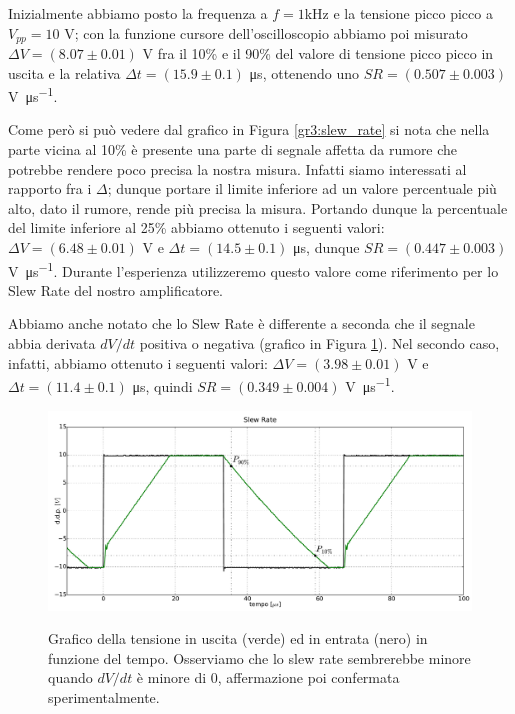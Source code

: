 Inizialmente abbiamo posto la frequenza a $f=1$\si{\kilo\hertz} e la tensione picco picco a $V_{pp}=10$ \si{\volt}; con la funzione cursore dell'oscilloscopio abbiamo poi misurato $\Delta V = (8.07 \pm 0.01)$ \si{\volt} fra il 10\% e il 90\% del valore di tensione picco picco in uscita e la relativa $\Delta t = (15.9 \pm 0.1)$ \si{\micro\second}, ottenendo uno $SR=(0.507 \pm 0.003)$ \si{\volt\per\micro\second}.

Come però si può vedere dal grafico in Figura \ref{gr3:slew_rate} si nota che nella parte vicina al 10\% è presente una parte di segnale affetta da rumore che potrebbe rendere poco precisa la nostra misura. Infatti siamo interessati al rapporto fra i $\Delta$; dunque portare il limite inferiore ad un valore percentuale più alto, dato il rumore, rende più precisa la misura. Portando dunque la percentuale del limite inferiore al 25\% abbiamo ottenuto i seguenti valori: $\Delta V = (6.48 \pm 0.01)$ \si{\volt} e $\Delta t = (14.5 \pm 0.1)$ \si{\micro\second}, dunque $SR = (0.447 \pm 0.003)$ \si{\volt\per\micro\second}. Durante l'esperienza utilizzeremo questo valore come riferimento per lo Slew Rate del nostro amplificatore.

Abbiamo anche notato che lo Slew Rate è differente a seconda che il segnale abbia derivata $dV/dt$ positiva o negativa (grafico in Figura \ref{gr3:slew_rate_down}). Nel secondo caso, infatti, abbiamo ottenuto i seguenti valori: $\Delta V = (3.98 \pm 0.01)$ \si{\volt} e $\Delta t = (11.4 \pm 0.1)$ \si{\micro\second}, quindi $SR = (0.349 \pm 0.004)$ \si{\volt\per\micro\second}.

\begin{figure}[ht]
 \centering
   {\includegraphics[width=16.5cm]{../E03/latex/sr_down.pdf}}
 \caption{Grafico della tensione in uscita (verde) ed in entrata (nero) in funzione del tempo. Osserviamo che lo slew rate sembrerebbe minore quando $dV/dt$ è minore di 0, affermazione poi confermata sperimentalmente.}
 \label{gr3:slew_rate_down}
\end{figure}
